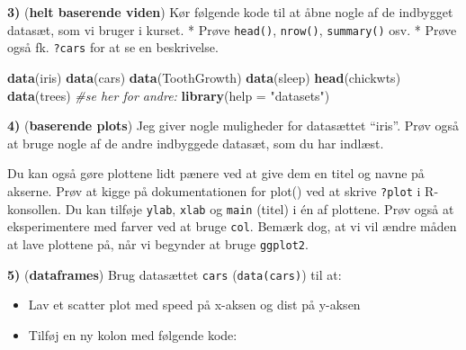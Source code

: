 \documentclass[
]{book}
\newenvironment{Shaded}{\begin{snugshade}}{\end{snugshade}}
\newcommand{\AttributeTok}[1]{\textcolor[rgb]{0.27,0.27,0.27}{#1}}
\newcommand{\CommentTok}[1]{\textcolor[rgb]{0.37,0.37,0.37}{\textit{#1}}}
\newcommand{\FunctionTok}[1]{\textcolor[rgb]{0.27,0.27,0.27}{\textbf{#1}}}
\newcommand{\NormalTok}[1]{#1}
\newcommand{\SpecialCharTok}[1]{\textcolor[rgb]{0.43,0.43,0.43}{\textbf{#1}}}
\newcommand{\StringTok}[1]{\textcolor[rgb]{0.5,0.5,0.5}{#1}}
\providecommand{\tightlist}{%
  \setlength{\itemsep}{0pt}\setlength{\parskip}{0pt}}
\begin{document}
\textbf{3)} (\textbf{helt baserende viden}) Kør følgende kode til at åbne nogle af de indbygget datasæt, som vi bruger i kurset. * Prøve \texttt{head()}, \texttt{nrow()}, \texttt{summary()} osv. * Prøve også fk. \texttt{?cars} for at se en beskrivelse.

\begin{Shaded}
\begin{Highlighting}[]
\FunctionTok{data}\NormalTok{(iris)}
\FunctionTok{data}\NormalTok{(cars)}
\FunctionTok{data}\NormalTok{(ToothGrowth)}
\FunctionTok{data}\NormalTok{(sleep)}
\FunctionTok{head}\NormalTok{(chickwts)}
\FunctionTok{data}\NormalTok{(trees)}
\CommentTok{\#se her for andre:}
\FunctionTok{library}\NormalTok{(}\AttributeTok{help =} \StringTok{"datasets"}\NormalTok{)}
\end{Highlighting}
\end{Shaded}

\textbf{4)} (\textbf{baserende plots}) Jeg giver nogle muligheder for datasættet ``iris''. Prøv også at bruge nogle af de andre indbyggede datasæt, som du har indlæst.

\begin{Shaded}
\end{Shaded}

Du kan også gøre plottene lidt pænere ved at give dem en titel og navne på akserne. Prøv at kigge på dokumentationen for plot() ved at skrive \texttt{?plot} i R-konsollen. Du kan tilføje \texttt{ylab}, \texttt{xlab} og \texttt{main} (titel) i én af plottene. Prøv også at eksperimentere med farver ved at bruge \texttt{col}. Bemærk dog, at vi vil ændre måden at lave plottene på, når vi begynder at bruge \texttt{ggplot2}.

\textbf{5)} (\textbf{dataframes}) Brug datasættet \texttt{cars} (\texttt{data(cars)}) til at:

\begin{itemize}
\tightlist
\item
  Lav et scatter plot med speed på x-aksen og dist på y-aksen
\item
  Tilføj en ny kolon med følgende kode:
\end{itemize}
\end{document}
